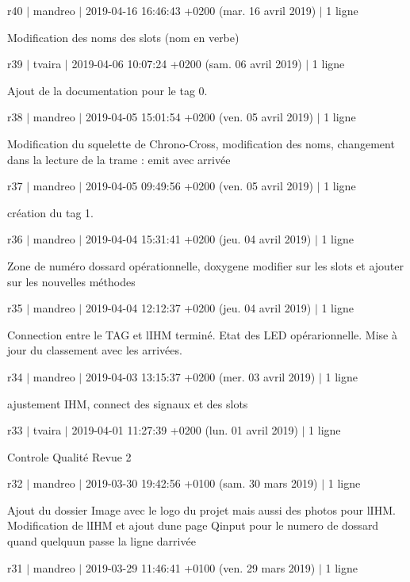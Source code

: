 r40 $\vert$ mandreo $\vert$ 2019-\/04-\/16 16\+:46\+:43 +0200 (mar. 16 avril 2019) $\vert$ 1 ligne

Modification des noms des slots (nom en verbe)

r39 $\vert$ tvaira $\vert$ 2019-\/04-\/06 10\+:07\+:24 +0200 (sam. 06 avril 2019) $\vert$ 1 ligne

Ajout de la documentation pour le tag 0.

r38 $\vert$ mandreo $\vert$ 2019-\/04-\/05 15\+:01\+:54 +0200 (ven. 05 avril 2019) $\vert$ 1 ligne

Modification du squelette de Chrono-\/\+Cross, modification des noms, changement dans la lecture de la trame \+: emit avec arrivée

r37 $\vert$ mandreo $\vert$ 2019-\/04-\/05 09\+:49\+:56 +0200 (ven. 05 avril 2019) $\vert$ 1 ligne

création du tag 1.

r36 $\vert$ mandreo $\vert$ 2019-\/04-\/04 15\+:31\+:41 +0200 (jeu. 04 avril 2019) $\vert$ 1 ligne

Zone de numéro dossard opérationnelle, doxygene modifier sur les slots et ajouter sur les nouvelles méthodes

r35 $\vert$ mandreo $\vert$ 2019-\/04-\/04 12\+:12\+:37 +0200 (jeu. 04 avril 2019) $\vert$ 1 ligne

Connection entre le T\+AG et l\textquotesingle{}I\+HM terminé. Etat des L\+ED opérarionnelle. Mise à jour du classement avec les arrivées.

r34 $\vert$ mandreo $\vert$ 2019-\/04-\/03 13\+:15\+:37 +0200 (mer. 03 avril 2019) $\vert$ 1 ligne

ajustement I\+HM, connect des signaux et des slots

r33 $\vert$ tvaira $\vert$ 2019-\/04-\/01 11\+:27\+:39 +0200 (lun. 01 avril 2019) $\vert$ 1 ligne

Controle Qualité Revue 2

r32 $\vert$ mandreo $\vert$ 2019-\/03-\/30 19\+:42\+:56 +0100 (sam. 30 mars 2019) $\vert$ 1 ligne

Ajout du dossier Image avec le logo du projet mais aussi des photos pour l\textquotesingle{}I\+HM. Modification de l\textquotesingle{}I\+HM et ajout d\textquotesingle{}une page Qinput pour le numero de dossard quand quelqu\textquotesingle{}un passe la ligne d\textquotesingle{}arrivée

r31 $\vert$ mandreo $\vert$ 2019-\/03-\/29 11\+:46\+:41 +0100 (ven. 29 mars 2019) $\vert$ 1 ligne

